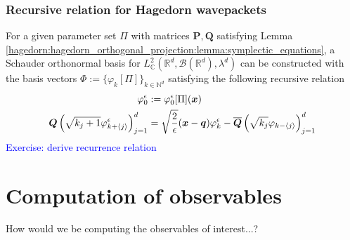 \documentclass[12pt]{article}
\numberwithin{equation}{section}
\begin{document}
        \subsubsection{Recursive relation for Hagedorn wavepackets}
        For a given parameter set $\Pi$ with matrices 
        $\bm{P}, \bm{Q}$ satisfying Lemma 
        \ref{hagedorn:hagedorn_orthogonal_projection:lemma:symplectic_equations},
        a Schauder orthonormal  
        basis 
        for 
        $L^2_{\mathbb{C}} (\mathbb{R}^d, \mathcal{B}(\mathbb{R}^d), \lambda^d)$ 
        can be constructed with the basis vectors 
        $\Phi := \{\varphi_k[\Pi]\}_{k \in \mathbb{N}^d}$ 
        satisfying the following recursive relation 
        \begin{align}
          \varphi_0^{\epsilon} &:= \varphi_0^\epsilon[\Pi](\bm{x})
          \notag
          \\
          \bm{Q} \left(\sqrt{k_j + 1 } \varphi^\epsilon_{k + \langle j \rangle} \right)_{j=1}^d&=
          \sqrt{\frac{2}{\epsilon}} (\bm{x} - \bm{q}) \varphi_k^\epsilon -
          \overline{\bm{Q}}
          \left(\sqrt{k_j} \varphi_{k - \langle j \rangle } \right)_{j=1}^d
          \label{hagedorn:hagedorn_wavepackets:recursive_relation}
        \end{align}
        \textcolor{blue}{Exercise: derive recurrence relation}
      
      \newpage
       
      \section{Computation of observables}
      How would we be computing the observables of interest...?
      
\end{document}
